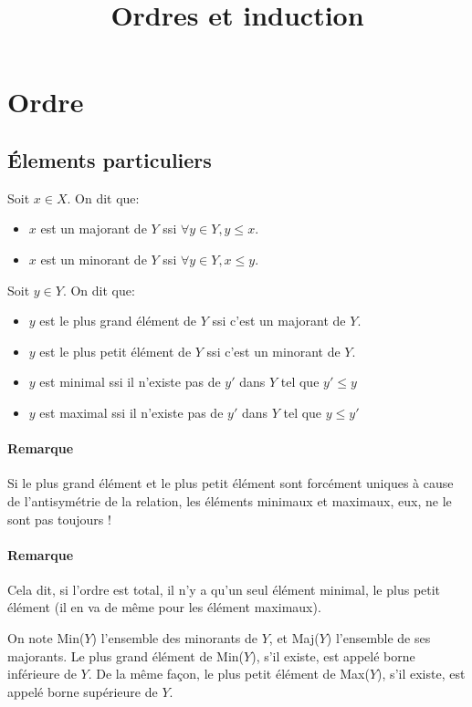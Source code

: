\documentclass{scrartcl}
\title{Ordres et induction}
\author{}
\date{}
\begin{document}
	\maketitle
	\section{Ordre}
		\subsection{Élements particuliers}
			Soit $x\in X$. On dit que:
			\begin{itemize}
				\item $x$ est un majorant de $Y$ ssi $\forall y \in Y, y\leq x$.
				\item $x$ est un minorant de $Y$ ssi $\forall y \in Y, x \leq y$.
			\end{itemize}
			Soit $y\in Y$. On dit que:
			\begin{itemize}
				\item $y$ est le plus grand élément de $Y$ ssi c'est un majorant de $Y$.
				\item $y$ est le plus petit élément de $Y$ ssi c'est un minorant de $Y$.
				\item $y$ est minimal ssi il n'existe pas de $y'$ dans $Y$ tel que $y'\leq y$
				\item $y$ est maximal ssi il n'existe pas de $y'$ dans $Y$ tel que $y\leq y'$
			\end{itemize}
			
			\paragraph{Remarque} Si le plus grand élément et le plus petit élément sont forcément uniques
			à cause de l'antisymétrie de la relation, les éléments minimaux et maximaux, eux, ne le sont
			pas toujours !

			\paragraph{Remarque} Cela dit, si l'ordre est total, il n'y a qu'un seul élément minimal, le plus
			petit élément (il en va de même pour les élément maximaux).

			On note Min($Y$) l'ensemble des minorants de $Y$, et Maj($Y$) l'ensemble de ses majorants.
			Le plus grand élément de Min($Y$), s'il existe, est appelé borne inférieure de $Y$. De la même façon,
			le plus petit élément de Max($Y$), s'il existe, est appelé borne supérieure de $Y$. 
\end{document}
